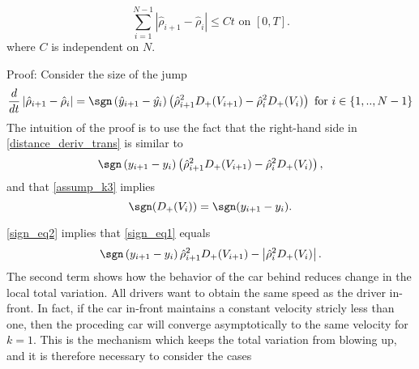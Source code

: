 \begin{equation}
	\sum_{i=1}^{N-1} \left| \hat{\rho}_{i+1}-\hat{\rho}_{i} \right| \leq C t \text{ on } [0,T].
\end{equation} \label{TV_yhat}
where $C$ is independent on $N$. 

Proof: 
Consider the size of the jump 
\begin{align} \label{distance_deriv_trans}
	\frac{d}{dt} \left| \hat{\rho}_{i+1} - \hat{\rho}_{i} \right| = \sgn\left(\hat{y}_{i+1} - \hat{y_{i}}\right) \left(\hat{\rho}_{i+1}^2D_+(V_{i+1}) - \hat{\rho}_{i}^2 D_+(V_i)\right) \text{ for } i \in \{1,..,N-1\}
\end{align}
The intuition of the proof is to use the fact that the right-hand side in \eqref{distance_deriv_trans} is similar to 
\begin{equation} \label{sign_eq1}
	\sgn\left(y_{i+1} - y_{i}\right) \left(\hat{\rho}_{i+1}^2 D_+(V_{i+1}) - \hat{\rho}_{i}^2 D_+(V_i)\right),
\end{equation}
and that \eqref{assump_k3} implies 
\begin{equation}\label{sign_eq2}
	\sgn(D_+(V_i)) = \sgn(y_{i+1} - y_i). 
\end{equation}

\eqref{sign_eq2} implies that \eqref{sign_eq1} equals
\begin{equation} \label{sign_eq3}
	\sgn\left(y_{i+1} - y_{i}\right)\hat{\rho}_{i+1}^2 D_+(V_{i+1}) - \left|\hat{\rho}_{i}^2 D_+(V_i)\right|.
\end{equation}
The second term shows how the behavior of the car behind reduces change in the local total variation. All drivers want to obtain the same speed as the driver in-front. In fact, if the car in-front maintains a constant velocity stricly less than one, then the proceding car will converge asymptotically to the same velocity for $k = 1$. This is the mechanism which keeps the total variation from blowing up, and it is therefore necessary to consider the cases

